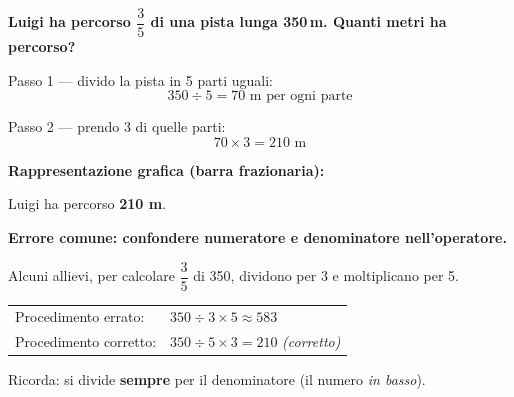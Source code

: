\begin{esempio}
    \textbf{Luigi ha percorso $\dfrac{3}{5}$ di una pista lunga 350\,m.
        Quanti metri ha percorso?}

    \medskip
    Passo 1 — divido la pista in 5 parti uguali:
    \[
        350 \div 5 = 70 \text{ m per ogni parte}
    \]

    Passo 2 — prendo 3 di quelle parti:
    \[
        70 \times 3 = 210 \text{ m}
    \]

    \medskip
    \textbf{Rappresentazione grafica (barra frazionaria):}

    \medskip
    \begin{center}
    \end{center}

    \medskip
    Luigi ha percorso \textbf{210 m}.
\end{esempio}

\begin{attenzione}
    \textbf{Errore comune: confondere numeratore e denominatore nell'operatore.}

    Alcuni allievi, per calcolare $\dfrac{3}{5}$ di 350, dividono per 3 e moltiplicano per 5.

    \medskip
    \begin{tabular}{ll}
        Procedimento errato:   & $350 \div 3 \times 5 \approx 583$ \\[4pt]
        Procedimento corretto: & $350 \div 5 \times 3 = 210$
        \quad\textit{(corretto)}
    \end{tabular}

    \medskip
    Ricorda: si divide \textbf{sempre} per il denominatore (il numero \emph{in basso}).
\end{attenzione}

